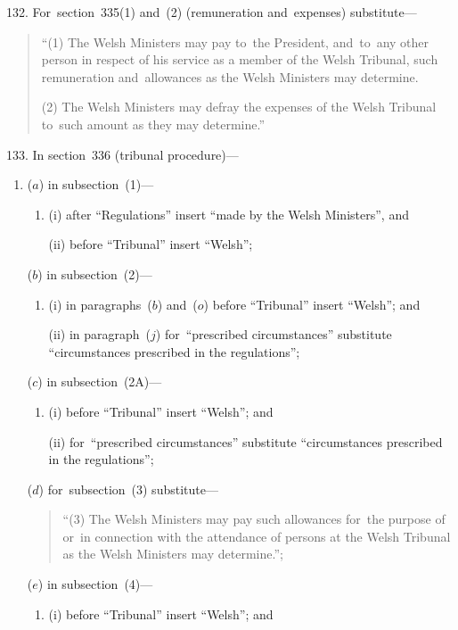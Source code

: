\documentclass[12pt,a4paper]{article}
\begin{document}
\medskip

132.  For~section~335(1) and~(2) (remuneration and~expenses) substitute—
\begin{quotation}
“(1) The Welsh Ministers may pay to~the President, and~to~any other person in respect of his service as a member of the Welsh Tribunal, such remuneration and~allowances as the Welsh Ministers may determine.

(2) The Welsh Ministers may defray the expenses of the Welsh Tribunal to~such amount as they may determine.”
\end{quotation}

\medskip

133.  In section~336 (tribunal procedure)—
\begin{enumerate}\item[]
($a$) in subsection~(1)—
\begin{enumerate}\item[]
(i) after “Regulations” insert “made by the Welsh Ministers”, and

(ii) before “Tribunal” insert “Welsh”;
\end{enumerate}

($b$) in subsection~(2)—
\begin{enumerate}\item[]
(i) in paragraphs~($b$)  and~($o$)  before “Tribunal” insert “Welsh”; and

(ii) in paragraph~($j$)  for~“prescribed circumstances” substitute “circumstances prescribed in the regulations”;
\end{enumerate}

($c$) in subsection~(2A)—
\begin{enumerate}\item[]
(i) before “Tribunal” insert “Welsh”; and

(ii) for~“prescribed circumstances” substitute “circumstances prescribed in the regulations”;
\end{enumerate}

($d$) for~subsection~(3) substitute—
\begin{quotation}
“(3) The Welsh Ministers may pay such allowances for~the purpose of or~in connection with the attendance of persons at the Welsh Tribunal as the Welsh Ministers may determine.”;
\end{quotation}

($e$) in subsection~(4)—
\begin{enumerate}\item[]
(i) before “Tribunal” insert “Welsh”; and


\end{enumerate}
\end{enumerate}
\end{document}
